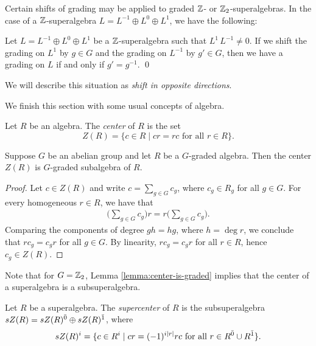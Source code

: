 Certain shifts of grading may be applied to graded $\mathbb{Z}$- or $\mathbb{Z}_2$-superalgebras. In the case of a $\mathbb{Z}$-superalgebra $L=L^{-1}\oplus L^{0}\oplus L^{1}$, we have the following:

\begin{lemma}\label{lemma:opposite-directions}
	Let $L=L^{-1}\oplus L^0\oplus L^1$ be a $\mathbb{Z}$-superalgebra such that $L^1\, L^{-1}\neq 0$. If we shift the grading on $L^1$ by $g\in G$ and the grading on $L^{-1}$ by $g' \in G$, then we have a grading on $L$ if and only if $g' = g^{-1}$. \qed
\end{lemma}

We will describe this situation as \emph{shift in opposite directions}.

We finish this section with some usual concepts of algebra.

\begin{defi}\label{defi:center}
	Let $R$ be an algebra.
	The \emph{center} of $R$ is the set
	\[
		Z(R) = \{c\in R \mid cr = rc \text{ for all } r\in R \}.
	\]
\end{defi}

\begin{lemma}\label{lemma:center-is-graded}
	Suppose $G$ be an abelian group and let $R$ be a $G$-graded algebra.
	Then the center $Z(R)$ is $G$-graded subalgebra of $R$.
\end{lemma}

\begin{proof}
	Let $c \in Z(R)$ and write $c = \sum_{g \in G} c_g$, where $c_g \in R_g$ for all $g \in G$.
	For every homogeneous $r \in R$, we have that
	\begin{align*}
		\big(\sum_{g\in G} c_g\big)r = r \big(\sum_{g\in G} c_g\big).
	\end{align*}
	Comparing the components of degree $gh = hg$, where $h = \deg r$, we conclude that $rc_g = c_g r$ for all $g \in G$.
	By linearity, $r c_g = c_g r$ for all $r\in R$, hence $c_g \in Z(R)$.
\end{proof}

Note that for $G=\mathbb{Z}_2$, Lemma \ref{lemma:center-is-graded} implies that the center of a superalgebra is a subsuperalgebra. 


\begin{defi}\label{defi:supercenter}
	Let $R$ be a superalgebra.
	The \emph{supercenter} of $R$ is the subsuperalgebra $sZ(R) = sZ(R)^{\bar0} \oplus sZ(R)^{\bar1}$, where
	\[
		sZ(R)^i = \{c\in R^i \mid cr = (-1)^{i|r|} rc \text{ for all } r\in R^{\bar0} \cup R^{\bar1} \}.
	\]
\end{defi}

